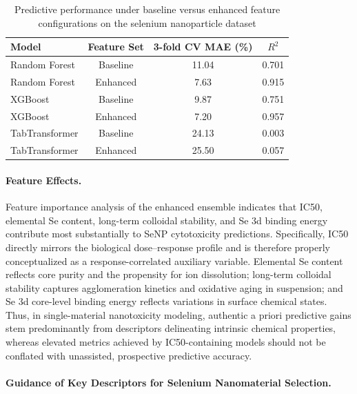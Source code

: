 \begin{table}[htbp]
  \centering
  \caption{Predictive performance under baseline versus enhanced feature configurations on the selenium nanoparticle dataset}
  \label{tab:senp_main_results}
  \begin{tabular}{lccc}
    \hline
    Model & Feature Set & 3-fold CV MAE (\%) & $R^2$ \\
    \hline
    Random Forest & Baseline & 11.04 & 0.701 \\
    Random Forest & Enhanced & 7.63 & 0.915 \\
    XGBoost & Baseline & 9.87 & 0.751 \\
    XGBoost & Enhanced & 7.20 & 0.957 \\
    TabTransformer & Baseline & 24.13 & 0.003 \\
    TabTransformer & Enhanced & 25.50 & 0.057 \\
    \hline
  \end{tabular}
\end{table}

\paragraph{Feature Effects.}
Feature importance analysis of the enhanced ensemble indicates that IC50, elemental Se content, long-term colloidal stability, and Se 3d binding energy contribute most substantially to SeNP cytotoxicity predictions. Specifically, IC50 directly mirrors the biological dose--response profile and is therefore properly conceptualized as a response-correlated auxiliary variable. Elemental Se content reflects core purity and the propensity for ion dissolution; long-term colloidal stability captures agglomeration kinetics and oxidative aging in suspension; and Se 3d core-level binding energy reflects variations in surface chemical states. Thus, in single-material nanotoxicity modeling, authentic a priori predictive gains stem predominantly from descriptors delineating intrinsic chemical properties, whereas elevated metrics achieved by IC50-containing models should not be conflated with unassisted, prospective predictive accuracy.

\paragraph{Guidance of Key Descriptors for Selenium Nanomaterial Selection.}

